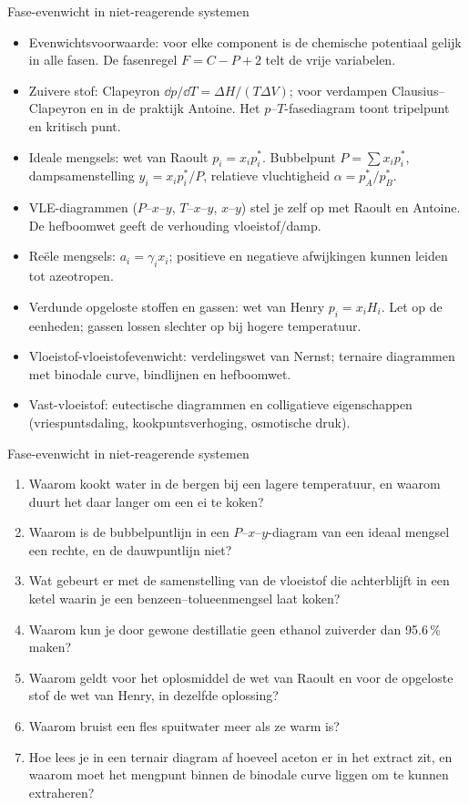 \begin{samenvatting}{Fase-evenwicht in niet-reagerende systemen}
\begin{itemize}
\item Evenwichtsvoorwaarde: voor elke component is de chemische potentiaal gelijk in alle fasen. De fasenregel $F = C - P + 2$ telt de vrije variabelen.
\item Zuivere stof: Clapeyron $\dd p/\dd T = \Delta H/(T\Delta V)$; voor verdampen Clausius--Clapeyron en in de praktijk Antoine. Het $p$--$T$-fasediagram toont tripelpunt en kritisch punt.
\item Ideale mengsels: wet van Raoult $p_i = x_i p_i^*$. Bubbelpunt $P = \sum x_i p_i^*$, dampsamenstelling $y_i = x_i p_i^*/P$, relatieve vluchtigheid $\alpha = p_A^*/p_B^*$.
\item VLE-diagrammen ($P$--$x$--$y$, $T$--$x$--$y$, $x$--$y$) stel je zelf op met Raoult en Antoine. De hefboomwet geeft de verhouding vloeistof/damp.
\item Re\"ele mengsels: $a_i = \gamma_i x_i$; positieve en negatieve afwijkingen kunnen leiden tot azeotropen.
\item Verdunde opgeloste stoffen en gassen: wet van Henry $p_i = x_i H_i$. Let op de eenheden; gassen lossen slechter op bij hogere temperatuur.
\item Vloeistof-vloeistofevenwicht: verdelingswet van Nernst; ternaire diagrammen met binodale curve, bindlijnen en hefboomwet.
\item Vast-vloeistof: eutectische diagrammen en colligatieve eigenschappen (vriespuntsdaling, kookpuntsverhoging, osmotische druk).
\end{itemize}
\end{samenvatting}

\begin{reflectie}{Fase-evenwicht in niet-reagerende systemen}
\begin{enumerate}
\item Waarom kookt water in de bergen bij een lagere temperatuur, en waarom duurt het daar langer om een ei te koken?
\item Waarom is de bubbelpuntlijn in een $P$--$x$--$y$-diagram van een ideaal mengsel een rechte, en de dauwpuntlijn niet?
\item Wat gebeurt er met de samenstelling van de vloeistof die achterblijft in een ketel waarin je een benzeen--tolueenmengsel laat koken?
\item Waarom kun je door gewone destillatie geen ethanol zuiverder dan 95.6\,\% maken?
\item Waarom geldt voor het oplosmiddel de wet van Raoult en voor de opgeloste stof de wet van Henry, in dezelfde oplossing?
\item Waarom bruist een fles spuitwater meer als ze warm is?
\item Hoe lees je in een ternair diagram af hoeveel aceton er in het extract zit, en waarom moet het mengpunt binnen de binodale curve liggen om te kunnen extraheren?
\end{enumerate}
\end{reflectie}


